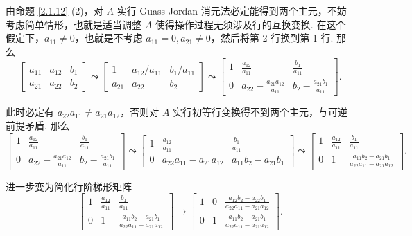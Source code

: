 \documentclass[10pt,openany]{article}
\theoremstyle{thmstyle} %
\theoremstyle{defstyle} %
\theoremstyle{prostyle} %
\theoremstyle{exastyle}
\theoremstyle{remstyle}
\begin{document}
由命题 \ref{2.1.12} (2)，对 \( \overline{A} \) 实行 Guass-Jordan 消元法必定能得到两个主元，不妨考虑简单情形，也就是适当调整 \( A \) 使得操作过程无须涉及行的互换变换. 在这个假定下，\( a_{11} \neq 0 \)，也就是不考虑 \( a_{11}=0, a_{21} \neq 0 \)，然后将第 2 行换到第 1 行. 那么
\[ \begin{bmatrix}
	a_{11} & a_{12} & b_1 \\
	a_{21} & a_{22} & b_2
\end{bmatrix} \leadsto \begin{bmatrix}
1 & a_{12}/a_{11} & b_1/a_{11} \\
a_{21} & a_{22} & b_2
\end{bmatrix} \leadsto \begin{bmatrix}
1 & \frac{a_{12}}{a_{11}} & \frac{b_1}{a_{11}} \\[2ex]
0 & a_{22} - \frac{a_{21} a_{12}}{a_{11}} & b_2 - \frac{a_{21} b_1}{a_{11}}
\end{bmatrix}. \]

此时必定有 \( a_{22}a_{11} \neq a_{21} a_{12} \)，否则对 \( A \) 实行初等行变换得不到两个主元，与可逆前提矛盾. 那么
\[ \begin{bmatrix}
	1 & \frac{a_{12}}{a_{11}} & \frac{b_1}{a_{11}} \\[2ex]
	0 & a_{22} - \frac{a_{21} a_{12}}{a_{11}} & b_2 - \frac{a_{21} b_1}{a_{11}}
\end{bmatrix} \leadsto \begin{bmatrix}
1 & \frac{a_{12}}{a_{11}} & \frac{b_1}{a_{11}} \\[2ex]
0 & a_{22}a_{11} - a_{21} a_{12} & a_{11} b_2 - a_{21} b_1
\end{bmatrix} \leadsto \begin{bmatrix}
1 & \frac{a_{12}}{a_{11}} & \frac{b_1}{a_{11}} \\[2ex]
0 & 1 & \frac{a_{11} b_2 - a_{21} b_1}{a_{22}a_{11} - a_{21} a_{12}}
\end{bmatrix}. \]

进一步变为简化行阶梯形矩阵
\[ \begin{bmatrix}
	1 & \frac{a_{12}}{a_{11}} & \frac{b_1}{a_{11}} \\[2ex]
	0 & 1 & \frac{a_{11} b_2 - a_{21} b_1}{a_{22}a_{11} - a_{21} a_{12}}
\end{bmatrix} \to \begin{bmatrix}
1 & 0 & \frac{a_{12} b_2 - a_{22} b_1}{a_{22}a_{11} - a_{21} a_{12}} \\[2ex]
0 & 1 & \frac{a_{11} b_2 - a_{21} b_1}{a_{22}a_{11} - a_{21} a_{12}}
\end{bmatrix}. \]
\end{document}
